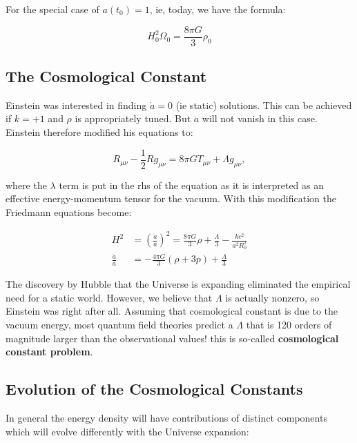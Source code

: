 \documentclass[
  letterpaper,
  DIV=11,
  numbers=noendperiod]{scrreprt}
\begin{document}
For the special case of \(a(t_0) = 1\), ie, today, we have the formula:

\[H_0^2\Omega_0 = \frac{8\pi G}{3}\rho_0\]

\subsection{The Cosmological Constant}\label{the-cosmological-constant}

Einstein was interested in finding \(\dot{a} = 0\) (ie static)
solutions. This can be achieved if \(k= + 1\) and \(\rho\) is
appropriately tuned. But \(\ddot a\) will not vanish in this case.
Einstein therefore modified his equations to:

\[R_{\mu\nu} - \frac{1}{2}Rg_{\mu\nu} = 8 \pi GT_{\mu\nu} + \Lambda g_{\mu\nu},\]

where the \(\lambda\) term is put in the rhs of the equation as it is
interpreted as an effective energy-momentum tensor for the vacuum. With
this modification the Friedmann equations become:

\[
\begin{aligned}
H^2  &=  \left(\frac{\dot a}{a} \right)^2 = \frac{8\pi G}{3}\rho + \frac{\Lambda}{3} - \frac{kc^{2}}{a^2R^2_0} \\
\frac{\ddot a}{a} &= -\frac{4\pi G}{3}(\rho + 3p) +  \frac{\Lambda}{3}
\end{aligned}
\]

The discovery by Hubble that the Universe is expanding eliminated the
empirical need for a static world. However, we believe that \(\Lambda\)
is actually nonzero, so Einstein was right after all. Assuming that
cosmological constant is due to the vacuum energy, most quantum field
theories predict a \(\Lambda\) that is 120 orders of magnitude larger
than the observational values! this is so-called \textbf{cosmological
constant problem}.

\subsection{Evolution of the Cosmological
Constants}\label{evolution-of-the-cosmological-constants}

In general the energy density will have contributions of distinct
components which will evolve differently with the Universe expansion:
\end{document}
